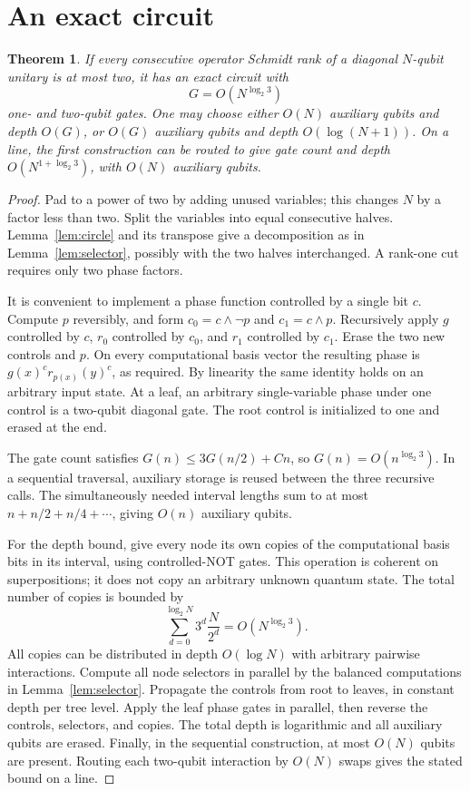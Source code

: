 \documentclass[11pt]{article}
\newtheorem{theorem}[lemma]{Theorem}
\begin{document}
\section{An exact circuit}

\begin{theorem}\label{thm:exact}
If every consecutive operator Schmidt rank of a diagonal $N$-qubit
unitary is at most two, it has an exact circuit with
\[
 G=O(N^{\log_2 3})
\]
one- and two-qubit gates. One may choose either $O(N)$ auxiliary qubits
and depth $O(G)$, or $O(G)$ auxiliary qubits and depth $O(\log(N+1))$.
On a line, the first construction can be routed to give gate count and
depth $O(N^{1+\log_2 3})$, with $O(N)$ auxiliary qubits.
\end{theorem}
\begin{proof}
Pad to a power of two by adding unused variables; this changes $N$ by a
factor less than two. Split the variables into equal consecutive halves.
Lemma~\ref{lem:circle} and its transpose give a decomposition as in
Lemma~\ref{lem:selector}, possibly with the two halves interchanged.
A rank-one cut requires only two phase factors.

It is convenient to implement a phase function controlled by a single
bit $c$. Compute $p$ reversibly, and form $c_0=c\wedge\neg p$ and
$c_1=c\wedge p$. Recursively apply $g$ controlled by $c$, $r_0$
controlled by $c_0$, and $r_1$ controlled by $c_1$. Erase the two new
controls and $p$. On every computational basis vector the resulting
phase is $g(x)^c r_{p(x)}(y)^c$, as required. By linearity the same
identity holds on an arbitrary input state. At a leaf, an arbitrary
single-variable phase under one control is a two-qubit diagonal gate.
The root control is initialized to one and erased at the end.

The gate count satisfies $G(n)\leq3G(n/2)+Cn$, so
$G(n)=O(n^{\log_2 3})$. In a sequential traversal, auxiliary storage is
reused between the three recursive calls. The simultaneously needed
interval lengths sum to at most $n+n/2+n/4+\cdots$, giving $O(n)$
auxiliary qubits.

For the depth bound, give every node its own copies of the computational
basis bits in its interval, using controlled-NOT gates. This operation
is coherent on superpositions; it does not copy an arbitrary unknown
quantum state. The total number of copies is bounded by
\[
 \sum_{d=0}^{\log_2N}3^d\frac{N}{2^d}=O(N^{\log_2 3}).
\]
All copies can be distributed in depth $O(\log N)$ with arbitrary
pairwise interactions. Compute all node selectors in parallel by the
balanced computations in Lemma~\ref{lem:selector}. Propagate the controls
from root to leaves, in constant depth per tree level. Apply the leaf
phase gates in parallel, then reverse the controls, selectors, and
copies. The total depth is logarithmic and all auxiliary qubits are
erased. Finally, in the sequential construction, at most $O(N)$ qubits
are present. Routing each two-qubit interaction by $O(N)$ swaps gives
the stated bound on a line.
\end{proof}
\end{document}
